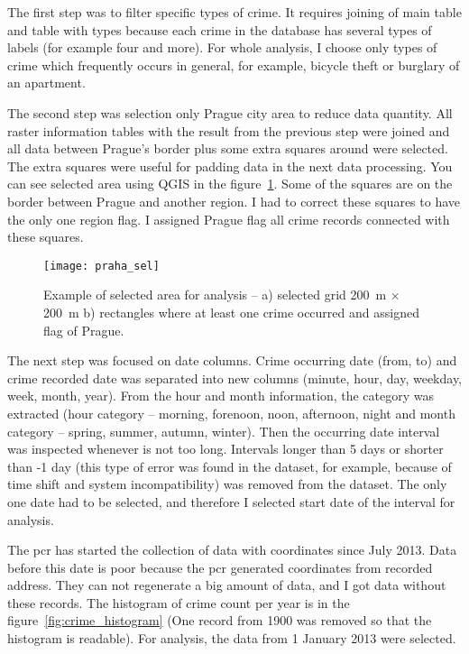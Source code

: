 \documentclass[thesis=M,english]{FITthesis}[2012/10/20]
\begin{document}
The first step was to filter specific types of crime. It requires joining of main table and table with types because each crime in the database has several types of labels (for example four and more). For whole analysis, I choose only types of crime which frequently occurs in general, for example, bicycle theft or burglary of an apartment. 


The second step was selection only Prague city area to reduce data quantity. All raster information tables with the result from the previous step were joined and all data between Prague's border plus some extra squares around were selected. The extra squares were useful for padding data in the next data processing. You can see selected area using QGIS in the figure~\ref{fig:prague_selected}. Some of the squares are on the border between Prague and another region. I had to correct these squares to have the only one region flag. I assigned Prague flag all crime records connected with these squares.

\begin{figure}[ht]\centering
    \texttt{[image: praha\_sel]}
    \caption{Example of selected area for analysis -- a) selected grid 200~m $\times$ 200~m b) rectangles where at least one crime occurred and assigned flag of Prague.}\label{fig:prague_selected}
\end{figure}

The next step was focused on date columns. Crime occurring date (from, to) and crime recorded date was separated into new columns (minute, hour, day, weekday, week, month, year). From the hour and month information, the category was extracted (hour category -- morning, forenoon, noon, afternoon, night and month category -- spring, summer, autumn, winter). Then the occurring date interval was inspected whenever is not too long. Intervals longer than 5 days or shorter than -1 day (this type of error was found in the dataset, for example, because of time shift and system incompatibility) was removed from the dataset. The only one date had to be selected, and therefore I selected start date of the interval for analysis.

The \gls{pcr} has started the collection of data with coordinates since July 2013. Data before this date is poor because the \gls{pcr} generated coordinates from recorded address. They can not regenerate a big amount of data, and I got data without these records. The histogram of crime count per year is in the figure~\ref{fig:crime_histogram} (One record from 1900 was removed so that the histogram is readable). For analysis, the data from 1 January 2013 were selected.
\end{document}
